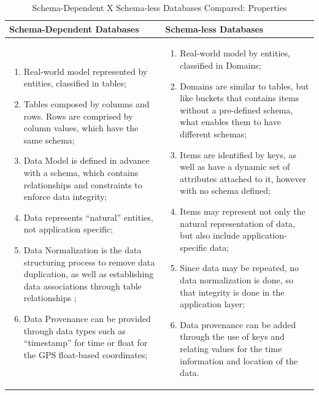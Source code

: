\begin{table}[!b]
    \label{tab:properties-schema-vs-schemaless}
    \caption{Schema-Dependent X Schema-less Databases Compared: Properties}
    \begin{center}
    \begin{tabular}{|p{210pt}|p{210pt}|}\hline
    Schema-Dependent Databases & Schema-less Databases\\\hline
    \begin{enumerate}
      \item Real-world model represented by entities, classified in tables;
      \item Tables composed by columns and rows. Rows are comprised by column
      values, which have the same schema;
      \item Data Model is defined in advance with a schema, which contains
      relationships and constraints to enforce data integrity;
      \item Data represents ``natural'' entities, not application specific;
      \item Data Normalization is the data structuring process to remove data
      duplication, as well as establishing data associations through table
      relationships \cite{db-normalization};
      \item Data Provenance can be provided through data types such as
      ``timestamp'' for time or float for the GPS float-based coordinates; 
    \end{enumerate} 
    & 
    \begin{enumerate}
      \item Real-world model by entities, classified in Domains;
      \item Domains are similar to tables, but like buckets that contains items
      without a pre-defined schema, what enables them to have different schemas;
      \item Items are identified by keys, as well as have a dynamic set of
      attributes attached to it, however with no schema defined;
      \item Items may represent not only the natural representation of data, but
      also include application-specific data;
      \item Since data may be repeated, no data normalization is done, so that
      integrity is done in the application layer;
      \item Data provenance can be added through the use of keys and relating
      values for the time information and location of the data.
    \end{enumerate}
    \\\hline
    \end{tabular}
    \end{center}
\end{table}


